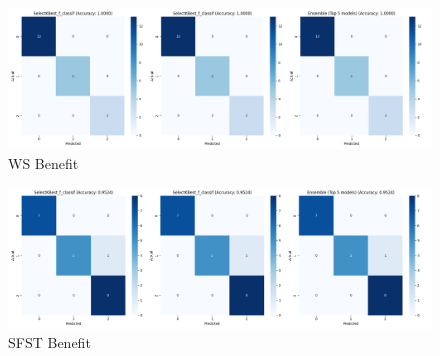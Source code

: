 \begin{figure}
    \centering
    \includegraphics[width=0.75\linewidth]{class_all_section/images_class_ensemble_reduction/confusion_matrices_WS_Benefit.png}
    \caption{WS Benefit}
    \label{fig:ws_ben_class_ensemble_reduction}
\end{figure}

\begin{figure}
    \centering
    \includegraphics[width=0.75\linewidth]{class_all_section/images_class_ensemble_reduction/confusion_matrices_SFST_Benefit.png}
    \caption{SFST Benefit}
    \label{fig:sfst_ben_class_ensemble_reduction}
\end{figure}


